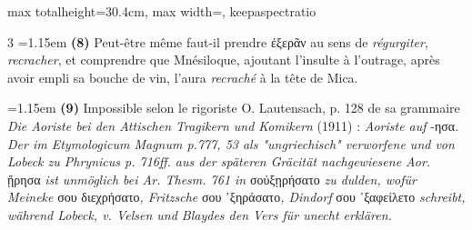 \documentclass[11pt,twoside]{book}
\newcommand{\currHeadLE}{}
\newcommand{\currHeadRE}{}
\newcommand{\currHeadLO}{}
\newcommand{\currHeadRO}{}
\newcommand{\italique}[1]{\textit{#1}}
\newcommand{\R}{\textbf{R}}
\newcommand{\allemand}[1]{\textit{#1}}
\begin{document}
\begin{adjustbox}{max totalheight=30.4cm, max width=\textwidth, keepaspectratio}
\begin{minipage}{\textwidth}
{\begin{multicols}{3}
\noindent\hangindent=1.15em {\color{sepiaNote}\textbf{(8)}} Peut-être même faut-il prendre ἐξερᾶν au sens de \italique{régurgiter}, \italique{recracher}, et comprendre que Mnésiloque, ajoutant l'insulte à l'outrage, après avoir empli sa bouche de vin, l'aura \italique{recraché} à la tête de Mica.
\par\vspace{1.5pt}
\noindent\hangindent=1.15em {\color{sepiaNote}\textbf{(9)}} Impossible selon le rigoriste O. Lautensach, p. 128 de sa grammaire \italique{Die Aoriste bei den Attischen Tragikern und Komikern} (1911) : \allemand{Aoriste auf} -ησα\allemand{. Der im Etymologicum Magnum p.777, 53 als "ungriechisch" verworfene und von Lobeck zu Phrynicus p. 716ff. aus der späteren Gräcität nachgewiesene Aor. }ᾕρησα \allemand{ist unmöglich bei Ar. \italique{Thesm.} 761 in} σοὐξῃρήσατο\allemand{ zu dulden, wofür Meineke} σου διεχρήσατο\allemand{, Fritzsche }σου ᾽ξηράσατο\allemand{, Dindorf} σου ᾽ξαφείλετο\allemand{ schreibt, während Lobeck, v. Velsen und Blaydes den Vers für unecht erklären.}
\par\end{multicols}}
\end{minipage}\end{adjustbox}
\clearpage\ifodd\value{page}\hbox{}\newpage\fi
\renewcommand{\currHeadLE}{ΑΡΙΣΤΟΦΑΝΟΥΣ ΘΕΣΜΟΦΟΡΙΑΖΟΥΣΑΙ · CODEX RAVENNAS 429 (\R)}
\renewcommand{\currHeadRE}{Folio f. 171v (Classense 173v) · vv. 765–799}
\renewcommand{\currHeadLO}{FAC-SIMILÉ DU CODEX RAVENNAS 429 (\R) · f. 171v (Classense 173v)}
\renewcommand{\currHeadRO}{vv. 765–799 · Planche recadrée sur la zone écrite et harmonisée}
\end{document}
